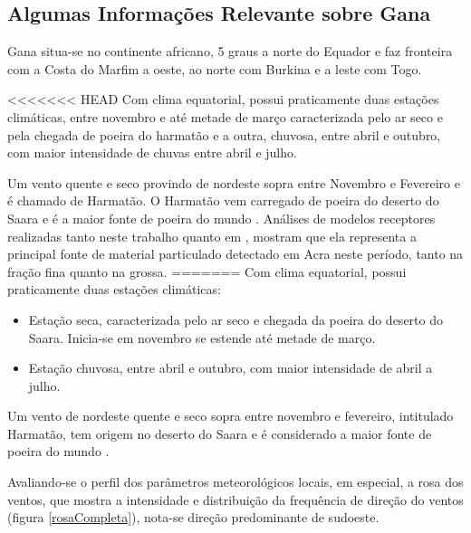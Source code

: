\subsection{Algumas Informações Relevante sobre Gana}


Gana situa-se no continente africano, 5 graus a norte do Equador e 
faz fronteira com a Costa do Marfim a oeste, ao norte com Burkina
e a leste com Togo. 

<<<<<<< HEAD
Com clima equatorial, possui praticamente duas estações climáticas, 
entre novembro e até metade de março caracterizada pelo ar seco e pela 
chegada de poeira do harmatão e a outra, chuvosa, entre abril e outubro, 
com maior intensidade de chuvas entre abril e julho. 

Um vento quente e seco provindo de nordeste sopra entre Novembro e Fevereiro 
e é chamado de Harmatão. O Harmatão vem carregado de poeira do 
deserto do Saara e é a maior fonte de poeira do mundo \citep{breuning2005}. 
Análises de modelos receptores realizadas tanto neste trabalho quanto em 
\cite{zhou2011}, mostram que ela representa a principal fonte de material 
particulado detectado em Acra neste período, tanto na fração fina quanto na grossa.
=======
Com clima equatorial, possui praticamente duas estações climáticas:

\begin{itemize}
  \item Estação seca, caracterizada pelo ar seco e chegada da poeira do deserto 
        do Saara. Inicia-se em novembro se estende até metade de março.
  \item Estação chuvosa, entre abril e outubro, com maior intensidade de abril a
        julho.
\end{itemize}

Um vento de nordeste quente e seco sopra entre novembro e fevereiro,
intitulado Harmatão, tem origem no deserto do Saara e é considerado 
a maior fonte de poeira do mundo \citep{breuning2005}.


Avaliando-se o perfil dos parâmetros meteorológicos locais, em especial, 
a rosa dos ventos, que mostra a intensidade e distribuição da frequência de 
direção do ventos (figura \ref{rosaCompleta}),
nota-se direção predominante de sudoeste. 

